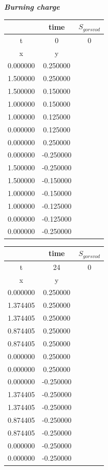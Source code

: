 \begin{center}
\begin{large}
\textbf{\textit {Burning charge}}\\
\end{large}
\begin{tabular}{|c|c|c|}
\hline
  & time & $S_{gor svod}$  \\
\hline
t & 0 & 0  \\
\hline
x & y &   \\
\hline
0.000000 &  0.250000 &
  \\ 
\hline
1.500000 &  0.250000 &
  \\ 
\hline
1.500000 &  0.150000 &
  \\ 
\hline
1.000000 &  0.150000 &
  \\ 
\hline
1.000000 &  0.125000 &
  \\ 
\hline
0.000000 &  0.125000 &
  \\ 
\hline
0.000000 &  0.250000 &
  \\ 
\hline
0.000000 &  -0.250000 &
  \\ 
\hline
1.500000 &  -0.250000 &
  \\ 
\hline
1.500000 &  -0.150000 &
  \\ 
\hline
1.000000 &  -0.150000 &
  \\ 
\hline
1.000000 &  -0.125000 &
  \\ 
\hline
0.000000 &  -0.125000 &
  \\ 
\hline
0.000000 &  -0.250000 &
  \\ 
\hline
\end{tabular}
\begin{tabular}{|c|c|c|}
\hline
  & time & $S_{gor svod}$  \\
\hline
t & 24 & 0  \\
\hline
x & y &   \\
\hline
0.000000 &  0.250000 &
  \\ 
\hline
1.374405 &  0.250000 &
  \\ 
\hline
1.374405 &  0.250000 &
  \\ 
\hline
0.874405 &  0.250000 &
  \\ 
\hline
0.874405 &  0.250000 &
  \\ 
\hline
0.000000 &  0.250000 &
  \\ 
\hline
0.000000 &  0.250000 &
  \\ 
\hline
0.000000 &  -0.250000 &
  \\ 
\hline
1.374405 &  -0.250000 &
  \\ 
\hline
1.374405 &  -0.250000 &
  \\ 
\hline
0.874405 &  -0.250000 &
  \\ 
\hline
0.874405 &  -0.250000 &
  \\ 
\hline
0.000000 &  -0.250000 &
  \\ 
\hline
0.000000 &  -0.250000 &
  \\ 
\hline
\end{tabular}
\end{center}
